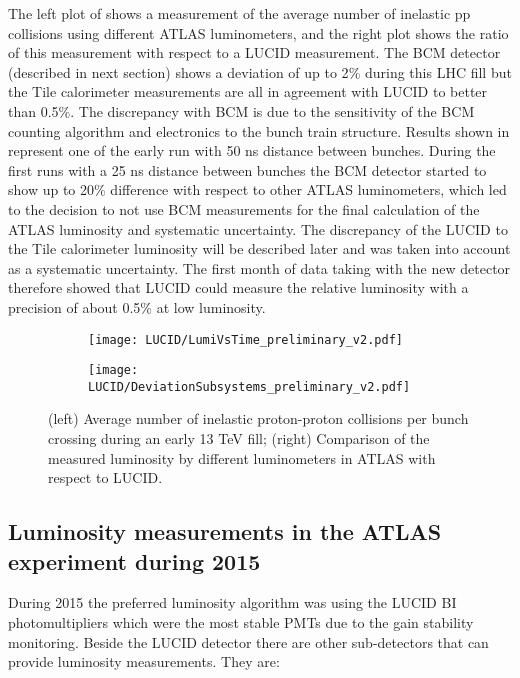 The left plot of  shows a measurement of the average number of inelastic pp collisions 
using different ATLAS 
luminometers, and the right plot shows the ratio of this measurement with respect to a LUCID measurement. The BCM 
detector (described in next section) shows a deviation of up to 2$\%$ during this LHC fill but the Tile calorimeter measurements are all in agreement 
with LUCID to better than 0.5$\%$.
The discrepancy with BCM is due to the sensitivity of the BCM counting algorithm and electronics to the bunch train structure.
Results shown in  represent one of the early run with 50 ns distance between bunches.
During the first runs with a 25 ns distance between bunches the BCM detector started to show up to 20$\%$ difference 
with respect to other ATLAS luminometers, which led to the decision to not use BCM measurements for the final calculation of the ATLAS luminosity and systematic uncertainty.
The discrepancy of the LUCID to the Tile calorimeter luminosity will be described later and was taken into account as a systematic uncertainty.
The first month of data taking with the new detector therefore showed that LUCID could measure the relative 
luminosity with a precision of about 0.5$\%$ at low luminosity.

\begin{figure}
\centering
\begin{subfigure}{.5\textwidth}
  \centering
  \texttt{[image: LUCID/LumiVsTime\_preliminary\_v2.pdf]}
  \label{fig:sub3}
\end{subfigure}%
\begin{subfigure}{.5\textwidth}
  \centering
  \texttt{[image: LUCID/DeviationSubsystems\_preliminary\_v2.pdf]}
  \label{fig:sub4}
\end{subfigure}
\caption{(left) Average number of inelastic proton-proton collisions per bunch crossing during an early 13 TeV fill; 
(right) Comparison of the measured luminosity by different luminometers in ATLAS with respect to LUCID.}
\label{fig:LumiVsTime}
\end{figure}

\subsection{Luminosity measurements in the ATLAS experiment during 2015}
\label{subsec:lumi_2015_2016}
During 2015 the preferred luminosity algorithm was using the LUCID BI photomultipliers which were the most stable PMTs due to the gain stability monitoring.
Beside the LUCID detector there are other sub-detectors that can provide luminosity measurements. They are: 

